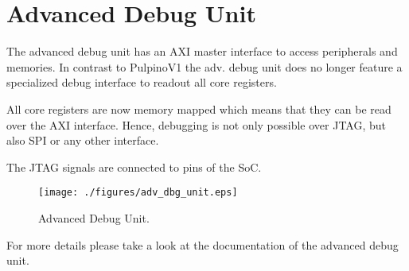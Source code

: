 \chapter{Advanced Debug Unit}

The advanced debug unit has an AXI master interface to access peripherals and
memories. In contrast to PulpinoV1 the adv. debug unit does no longer feature
 a specialized debug interface to readout all core registers.

All core registers are now memory mapped which means that they can be read over
 the AXI interface. Hence, debugging is not only possible over JTAG, but also SPI
 or any other interface.

The JTAG signals are connected to pins of the SoC.

\begin{figure}[H]
  \centering
  \texttt{[image: ./figures/adv\_dbg\_unit.eps]}
  \caption{Advanced Debug Unit.}
  \label{fig:adv_dbg_unit}
\end{figure}

For more details please take a look at the documentation of the advanced debug unit.


